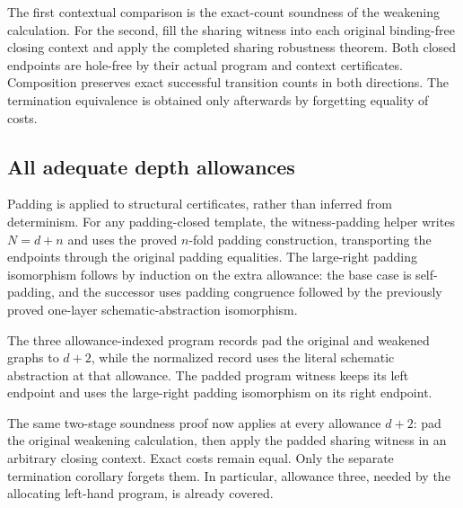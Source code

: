 The first contextual comparison is the exact-count soundness of the
weakening calculation. For the second, fill the sharing witness into each
original binding-free closing context and apply the completed sharing
robustness theorem. Both closed endpoints are hole-free by their actual
program and context certificates. Composition preserves exact successful
transition counts in both directions. The termination equivalence is
obtained only afterwards by forgetting equality of costs.

\subsection{All adequate depth allowances}
Padding is applied to structural certificates, rather than inferred from
determinism. For any padding-closed template, the witness-padding helper
writes $N=d+n$ and uses the proved $n$-fold padding construction, transporting
the endpoints through the original padding equalities. The large-right
padding isomorphism follows by induction on the extra allowance: the base
case is self-padding, and the successor uses padding congruence followed
by the previously proved one-layer schematic-abstraction isomorphism.

The three allowance-indexed program records pad the original and weakened
graphs to $d+2$, while the normalized record uses the literal schematic
abstraction at that allowance. The padded program witness keeps its left
endpoint and uses the large-right padding isomorphism on its right endpoint.

The same two-stage soundness proof now applies at every allowance $d+2$:
pad the original weakening calculation, then apply the padded sharing
witness in an arbitrary closing context. Exact costs remain equal. Only
the separate termination corollary forgets them. In particular, allowance
three, needed by the allocating left-hand program, is already covered.

